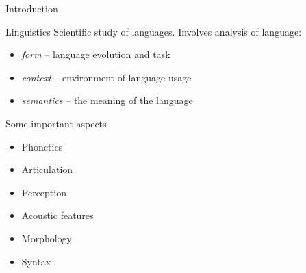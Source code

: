 \documentclass{beamer}
\begin{document}
\begin{frame}{Introduction}

\begin{block}{Linguistics}
Scientific study of languages. Involves analysis of language:
\begin{itemize}
\item \textit{form} -- language evolution and task
\item \textit{context} -- environment of language usage
\item \textit{semantics} -- the meaning of the language
\end{itemize}
\end{block}

\begin{block}{Some important aspects}
\begin{itemize}
\item Phonetics
\item Articulation
\item Perception
\item Acoustic features
\item Morphology
\item Syntax
\end{itemize}
\end{block}

\end{frame}
\end{document}
